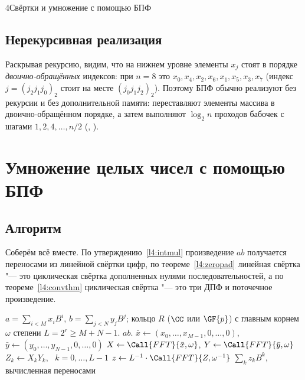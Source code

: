 \begin{lecture}{4}{Свёртки и умножение с помощью БПФ}
\subsection{Нерекурсивная реализация}

Раскрывая рекурсию, видим, что на нижнем уровне элементы $x_j$ стоят в порядке
\emph{двоично-обращённых} индексов: при $n = 8$ это $x_0, x_4, x_2, x_6, x_1, x_5, x_3, x_7$
(индекс $j = (j_2 j_1 j_0)_2$ стоит на месте $(j_0 j_1 j_2)_2$). Поэтому БПФ обычно реализуют
без рекурсии и без дополнительной памяти: переставляют элементы массива в двоично-обращённом
порядке, а затем выполняют $\log_2 n$ проходов бабочек с шагами $1, 2, 4, \dots, n/2$
(\cite[гл.~30]{clrs}, \cite[разд.~9.5.2]{crandall-pomerance}).



\section{Умножение целых чисел с помощью БПФ}

\subsection{Алгоритм}

Соберём всё вместе. По утверждению~\ref{l4:intmul} произведение $ab$ получается переносами из
линейной свёртки цифр, по теореме~\ref{l4:zeropad} линейная свёртка "--- это циклическая свёртка
дополненных нулями последовательностей, а по теореме~\ref{l4:convthm} циклическая свёртка "---
это три ДПФ и поточечное произведение.

\begin{algorithm}\label{l4:alg-fftmul}
\begin{algorithmic}[1]
\Require $a = \sum_{i<M} x_i B^i$, $b = \sum_{j<N} y_j B^j$; кольцо $R$ ($\CC$ или $\GF{p}$) с главным
  корнем $\omega$ степени $L = 2^r \ge M + N - 1$.
\Ensure $ab$.
\State $\bar x \gets (x_0, \dots, x_{M-1}, 0, \dots, 0)$, $\bar y \gets (y_0, \dots, y_{N-1}, 0, \dots, 0)$
\State $X \gets \Call{FFT}{\bar x, \omega}$, \quad $Y \gets \Call{FFT}{\bar y, \omega}$
\State $Z_k \gets X_k Y_k$, \ $k = 0, \dots, L - 1$
\State $z \gets L^{-1} \cdot \Call{FFT}{Z, \omega^{-1}}$
\State \Return $\sum_k z_k B^k$, вычисленная переносами
\end{algorithmic}
\end{algorithm}


\end{lecture}
